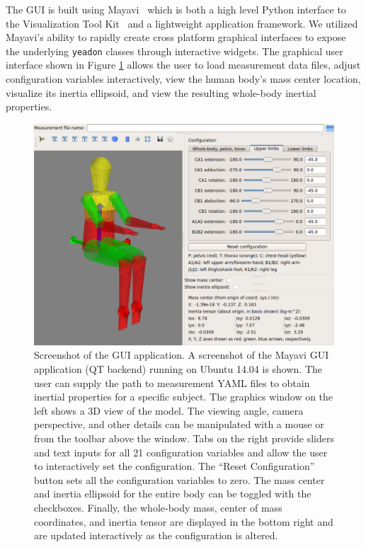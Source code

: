 \documentclass[10pt,a4paper,twocolumn]{article}
\begin{document}
The GUI is built using Mayavi~\cite{Ramachandran2011} which is both a high
level Python interface to the Visualization Tool Kit~\cite{Schroeder2006} and a
lightweight application framework. We utilized Mayavi's ability to rapidly
create cross platform graphical interfaces to expose the underlying
\verb+yeadon+ classes through interactive widgets. The graphical user interface
shown in Figure \ref{fig:gui} allows the user to load measurement data files,
adjust configuration variables interactively, view the human body's mass center
location, visualize its inertia ellipsoid, and view the resulting whole-body
inertial properties.

\begin{figure}
  \begin{center}
    \includegraphics{figures/gui-screenshot.png}
  \end{center}
  \caption{
    Screenshot of the GUI application. A screenshot of the Mayavi GUI
    application (QT backend) running on Ubuntu 14.04 is shown. The user can
    supply the path to measurement YAML files to obtain inertial properties for
    a specific subject. The graphics window on the left shows a 3D view of the
    model. The viewing angle, camera perspective, and other details can be
    manipulated with a mouse or from the toolbar above the window. Tabs on the
    right provide sliders and text inputs for all 21 configuration variables
    and allow the user to interactively set the configuration. The ``Reset
    Configuration'' button sets all the configuration variables to zero. The
    mass center and inertia ellipsoid for the entire body can be toggled with
    the checkboxes. Finally, the whole-body mass, center of mass coordinates,
    and inertia tensor are displayed in the bottom right and are updated
    interactively as the configuration is altered.
  }
  \label{fig:gui}
\end{figure}
\end{document}
